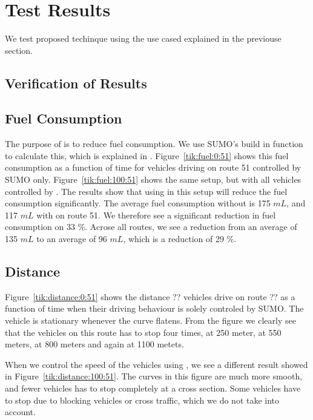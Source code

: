 \section{Test Results}
We test proposed techinque using the use cased explained in the previouse section.

\subsection{Verification of Results}

\subsection{Fuel Consumption}
The purpose of \tech is to reduce fuel consumption. 
We use SUMO's build in function to calculate this, which is explained in \cite{SUMOFuel}.
Figure~\ref{tik:fuel:0:51} shows this fuel consumption as a function of time for vehicles driving on route 51 controlled by SUMO only. Figure~\ref{tik:fuel:100:51} shows the same setup, but with all vehicles controlled by \tech.
The results show that using \tech in this setup will reduce the fuel consumption significantly.
The average fuel consumption without \tech is 175 $mL$, and 117 $mL$ with \tech on route 51. 
We therefore see a significant reduction in fuel consumption on 33 \%.
Acrose all routes, we see a reduction from an average of 135 $mL$ to an average of 96 $mL$, which is a reduction of 29 \%.
%
%


\subsection{Distance}
Figure~\ref{tik:distance:0:51} shows the distance ?? vehicles drive on route ?? as a function of time when their driving behaviour is solely controled by SUMO. 
The vehicle is stationary whenever the curve flatens.
From the figure we clearly see that the vehicles on this route has to stop four times, at 250 meter, at 550 meters, at 800 meters and again at 1100 metets.

When we control the speed of the vehicles using \tech, we see a different result showed in Figure~\ref{tik:distance:100:51}.
The curves in this figure are much more smooth, and fewer vehicles has to stop completely at a cross section.
Some vehicles have to stop due to blocking vehicles or cross traffic, which we do not take into account.


